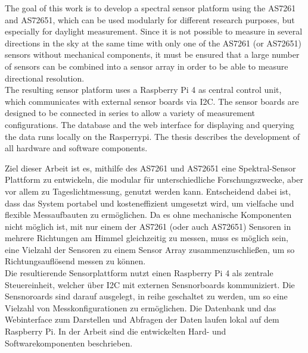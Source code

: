 The goal of this work is to develop a spectral sensor platform using the AS7261 and AS72651, which can be used modularly for different research purposes, but especially for daylight measurement. Since it is not possible to measure in several directions in the sky at the same time with only one of the AS7261 (or AS72651) sensors without mechanical components, it must be ensured that a large number of sensors can be combined into a sensor array in order to be able to measure directional resolution.\\
The resulting sensor platform uses a Raspberry Pi 4 as central control unit, which communicates with external sensor boards via I2C.
The sensor boards are designed to be connected in series to allow a variety of measurement configurations.
The database and the web interface for displaying and querying the data runs locally on the Rasperrypi.
The thesis describes the development of all hardware and software components.\bigskip

\noindent Ziel dieser Arbeit ist es, mithilfe des AS7261 und AS72651 eine Spektral-Sensor Plattform zu entwickeln, die modular für unterschiedliche Forschungszwecke, aber vor allem zu Tageslichtmessung, genutzt werden kann. Entscheidend dabei ist, dass das System portabel und kosteneffizient umgesetzt wird, um vielfache und flexible Messaufbauten zu ermöglichen. Da es ohne mechanische Komponenten nicht möglich ist, mit nur einem der AS7261 (oder auch AS72651) Sensoren in mehrere Richtungen am Himmel gleichzeitig zu messen, muss es möglich sein, eine Vielzahl der Sensoren zu einem Sensor Array zusammenzuschließen, um so Richtungsauflösend messen zu können. \\
Die resultierende Sensorplattform nutzt einen Raspberry Pi 4 als zentrale Steuereinheit, welcher über I2C mit externen Sensnorboards kommuniziert.
Die Sensnoroards sind darauf ausgelegt, in reihe geschaltet zu werden, um so eine Vielzahl von Messkonfigurationen zu ermöglichen. Die Datenbank und das Webinterface zum Darstellen und Abfragen der Daten laufen lokal auf dem Raspberry Pi. In der Arbeit sind die entwickelten Hard- und Softwarekomponenten beschrieben.
